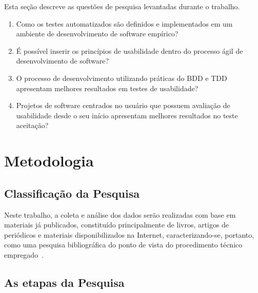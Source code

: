 Esta seção descreve as questões de pesquisa levantadas durante o trabalho.

\begin{enumerate}
\item Como os testes automatizados são definidos e implementados em um ambiente de desenvolvimento de software empírico?
\item É possível inserir os princípios de usabilidade dentro do processo ágil de desenvolvimento de software?
\item O processo de desenvolvimento utilizando práticas do BDD e TDD apresentam melhores resultados em testes de usabilidade?
\item Projetos de software centrados no usuário que possuem avaliação de usabilidade desde o seu início apresentam melhores resultados no teste aceitação?
\end{enumerate}
	 
\section{Metodologia}

\subsection{Classificação da Pesquisa}

Neste trabalho, a coleta e análise dos dados serão realizadas com base em  materiais já publicados, constituído principalmente de livros, artigos de periódicos e  materiais disponibilizados na Internet, caracterizando-se, portanto, como uma pesquisa bibliográfica do ponto de vista do procedimento técnico empregado~\cite{gil1991}.


\subsection{As etapas da Pesquisa}

